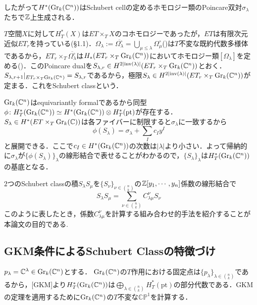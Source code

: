 したがって$H^*(\text{Gr}_k(\mathbb{C}^n))$はSchubert cellの定めるホモロジー類のPoincare双対$\sigma_\lambda$たちで$\mathbb{Z}$上生成される．

$T$空間$X$に対して$H^*_T(X)$は$ET\times_TX$のコホモロジーであったが，$ET$は有限次元近似$ET_r$を持っている(§1.1)．$\Omega_\lambda:=\overline{\Omega_\lambda^\circ}=\bigcup_{\mu\leq\lambda}\Omega_\mu^\circ$(\cite{fulton young tableaux})は$T$不変な既約代数多様体であるから，$ET_r\times_T\overline{\Omega_\lambda^\circ}$は$H_*(ET_r\times_T\text{Gr}_k(\mathbb{C}^n))$においてホモロジー類$[\Omega_\lambda]$を定める(\cite{fulton young tableaux})．このPoincare dualを$S_{\lambda,r}\in H^{2|\text{inv}(\lambda)|}(ET_r\times_T\text{Gr}_k(\mathbb{C}^n))$とおく．$S_{\lambda,r+1}|_{ET_r\times_T\text{Gr}_k(\mathbb{C}^n)} = S_{\lambda,r}$であるから，極限$S_\lambda\in H^{2|\text{inv}(\lambda)|}(ET_r\times_T\text{Gr}_k(\mathbb{C}^n))$が定まる．これをSchubert classという．

$\text{Gr}_k(\mathbb{C}^n)$はequivariantly formalであるから同型
$\phi\colon H^*_T(\text{Gr}_k(\mathbb{C}^n))\simeq H^*(\text{Gr}_k(\mathbb{C}^n))\otimes H^*_T(\text{pt})$が存在する．$S_\lambda\in H^*(ET\times_T\text{Gr}_k(\mathbb{C}))$は各ファイバーに制限すると$\sigma_\lambda$に一致するから
\[
\phi(S_\lambda) = \sigma_\lambda + \sum_{I}c_Iy^I
\]
と展開できる．ここで$c_I\in H^*(\text{Gr}_k(\mathbb{C}^n))$の次数は$|\lambda|$より小さい．よって帰納的に$\sigma_\lambda$が$\{\phi(S_\lambda)\}_\lambda$の線形結合で表せることがわかるので，$\{S_\lambda\}_\lambda$は$H^*_T(\text{Gr}_k(\mathbb{C}^n))$の基底となる．


$2$つのSchubert classの積$S_\lambda S_\mu$を$\{S_\nu\}_{\nu\in\binom{n}{k}}$の$\mathbb{Z}[y_1,\cdots,y_n]$係数の線形結合で
\begin{equation}\label{LRcoeff}
  S_\lambda S_\mu=\sum_{\nu\in\binom{n}{k}}C^\nu_{\lambda\mu}S_\nu
\end{equation}
このように表したとき，係数$C^{\nu}_{\lambda\mu}$を計算する組み合わせ的手法を紹介することが本論文の目的である.





\subsection{GKM条件によるSchubert Classの特徴づけ}

$p_\lambda = \mathbb{C}^\lambda\in\text{Gr}_k(\mathbb{C}^n)$とする．
$\text{Gr}_k(\mathbb{C}^n)$の$T$作用における固定点は$\{p_\lambda\}_{\lambda\in\binom{n}{k}}$であるから，[GKM]より$H^*_T(\text{Gr}_k(\mathbb{C}^n))$は$\bigoplus_{\lambda\in\binom{n}{k}}H^*_T(\text{pt})$の部分代数である．GKMの定理を適用するために$\text{Gr}_k(\mathbb{C}^n)$の$T$不変な$\mathbb{CP}^1$を計算する．

